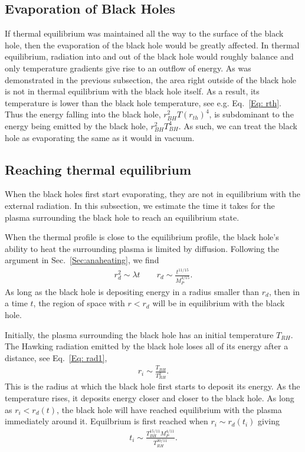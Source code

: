 \documentclass[superscriptaddress,groupedaddress,nofootnoteinbib,11pt]{article}
\newcommand{\MP}{M_P}
\newcommand\eea{\end{eqnarray}}
\newcommand\bea{\begin{eqnarray}}
\begin{document}
\subsection{Evaporation of Black Holes}

If thermal equilibrium was maintained all the way to the surface of the black hole, then the evaporation of the black hole would be greatly affected.  In thermal equilibrium, radiation into and out of the black hole would roughly balance and only temperature gradients give rise to an outflow of energy.  
As was demonstrated in the previous subsection, the area right outside of the black hole is not in thermal equilibrium with the black hole itself.  As a result, its temperature is lower than the black hole temperature, see e.g. Eq.~\ref{Eq: rth}.  Thus the energy falling into the black hole, $r_{BH}^2 T(r_{th})^4$,  is subdominant to the energy being emitted by the black hole, $r_{BH}^2 T_{BH}^4$.  As such, we can treat the black hole as evaporating the same as it would in vacuum.

\subsection{Reaching thermal equilibrium}

When the black holes first start evaporating, they are not in equilibrium with the external radiation.  In this subsection, we estimate the time it takes for the plasma surrounding the black hole to reach an equilibrium state.

When the thermal profile is close to the equilibrium profile, the black hole's ability to heat the surrounding plasma is limited by diffusion.  Following the argument in Sec.~\ref{Sec:anaheating}, we find
\bea
r_{d}^2 \sim \lambda t \qquad r_d \sim \frac{t^{11/15}}{\MP^{4/15}}.
\eea
As long as the black hole is depositing energy in a radius smaller than $r_d$, then in a time $t$, the region of space with $r < r_d$ will be in equilibrium with the black hole.

Initially, the plasma surrounding the black hole has an initial temperature $T_{RH}$.  The Hawking radiation emitted by the black hole loses all of its energy after a distance, see Eq.~\ref{Eq: rad1},
\bea
r_i \sim \frac{T_{BH}}{T_{RH}^2}.
\eea
This is the radius at which the black hole first starts to deposit its energy.  As the temperature rises, it deposits energy closer and closer to the black hole.  As long as $r_i < r_d(t)$, the black hole will have reached equilibrium with the plasma immediately around it.  Equilbrium is first reached when $r_i \sim r_d(t_i)$ giving
\bea
t_i \sim \frac{T_{BH}^{15/11} \MP^{4/11}}{T_{RH}^{30/11}}.
\eea
\end{document}
